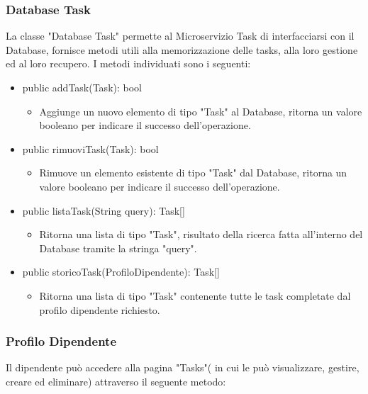 \documentclass{report}
\begin{document}
\subsubsection*{Database Task}
La classe "Database Task" permette al Microservizio Task di interfacciarsi con il Database, fornisce metodi utili alla memorizzazione delle tasks, alla loro gestione ed al loro recupero. I metodi individuati sono i seguenti:
\begin{itemize}
\item public addTask(Task): bool
\begin{itemize}
    \item Aggiunge un nuovo elemento di tipo "Task" al Database, ritorna un valore booleano per indicare il successo dell'operazione.
\end{itemize}
\item public rimuoviTask(Task): bool
\begin{itemize}
    \item Rimuove un elemento esistente di tipo "Task" dal Database, ritorna un valore booleano per indicare il successo dell'operazione.
\end{itemize}
\item public listaTask(String query): Task[]
\begin{itemize}
    \item Ritorna una lista di tipo "Task", risultato della ricerca fatta all'interno del Database tramite la stringa "query".
\end{itemize}
\item public storicoTask(ProfiloDipendente): Task[]
\begin{itemize}
    \item Ritorna una lista di tipo "Task" contenente tutte le task completate dal profilo dipendente richiesto.
\end{itemize}
\end{itemize}

\subsubsection*{Profilo Dipendente}
Il dipendente può accedere alla pagina "Tasks"( in cui le può visualizzare, gestire, creare ed eliminare) attraverso il seguente metodo:
\end{document}
